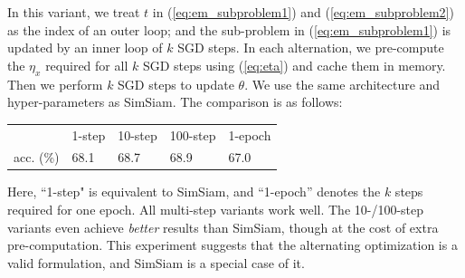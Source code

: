 \documentclass[final]{cvpr}
\newcommand{\tablestyle}[2]{\setlength{\tabcolsep}{#1}\renewcommand{\arraystretch}{#2}\centering\footnotesize}
\begin{document}
In this variant, we treat $t$ in (\ref{eq:em_subproblem1}) and (\ref{eq:em_subproblem2}) as the index of an outer loop; and the sub-problem in (\ref{eq:em_subproblem1}) is updated by an inner loop of $k$ SGD steps. 
In each alternation, we \mbox{pre-compute} the $\eta_x$ required for all $k$ SGD steps using (\ref{eq:eta}) and cache them in memory.
Then we perform $k$ SGD steps to update $\theta$.
We use the same architecture and hyper-parameters as SimSiam.
The comparison is as follows:
{
\begin{center}
\vspace{-.2em}
\small
\tablestyle{1pt}{1.1}
\begin{tabular}{x{42} | x{42} x{42} x{42} x{42}}
& 1-step & 10-step & 100-step & 1-epoch \\
\shline
acc. (\%) & 68.1 & 68.7 & 68.9 & 67.0 \\
\end{tabular}
\vspace{-.2em}
\end{center}
}
\noindent Here, ``1-step" is equivalent to SimSiam, and ``1-epoch'' denotes the $k$ steps required for one epoch. All multi-step variants work well. The 10-/100-step variants even achieve \emph{better} results than SimSiam, though at the cost of extra pre-computation.
This experiment suggests that the alternating optimization is a valid formulation, and SimSiam is a special case of it.
\end{document}
